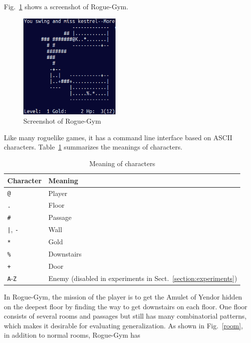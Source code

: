 \documentclass[conference]{IEEEtran}
\newcommand\sym{\texttt}
\begin{document}
Fig.~\ref{ss1} shows a screenshot of Rogue-Gym.
\begin{figure}[t]
 \centering
 \includegraphics[width=5cm]{pictures/rg2.png}
 \caption{Screenshot of Rogue-Gym} \label{ss1}
\end{figure}
Like many roguelike games, it has a command line interface based on ASCII
characters.  Table~\ref{syms} summarizes the meanings of characters. 
\begin{table}[t]
  \centering
 \caption{Meaning of characters} \label{syms}
  \begin{tabular}{l|l} \hline
   Character & Meaning \\ \hline
   \sym{@} & Player \\
   \sym{.} & Floor \\
   \sym{\#} & Passage \\
   \sym{|}, \sym{-} & Wall \\
   \sym{*} & Gold \\
   \sym{\%} & Downstairs \\
   \sym{+} & Door \\ 
   \sym{A}-\sym{Z} & Enemy (disabled in experiments in Sect.~\ref{section:experiments})
\\ \hline
  \end{tabular}
\end{table}

In Rogue-Gym, the mission of the player is to get the Amulet of Yendor
hidden on the deepest floor by finding the way to get downstairs on
each floor.
One floor consists of several rooms and passages but still has many
combinatorial patterns, which makes it desirable for evaluating
generalization.
As shown in Fig.~\ref{room}, in addition to normal rooms, Rogue-Gym has
\end{document}
